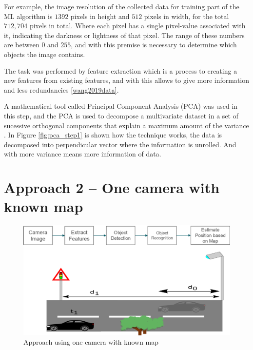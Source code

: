 For example, the image resolution of the collected data for training part of the ML algorithm is $1392$ pixels in height and $512$ pixels in width, for the total $712,704$ pixels in total. Where each pixel has a single pixel-value associated with it, indicating the darkness or lightness of that pixel. The range of these numbers are between $0$ and $255$, and with this premise is necessary to determine which objects the image contains.

The task was performed by feature extraction which is a process to creating a new features from existing features, and with this allows to give more information and less redundancies \ref{wang2019data}.

A mathematical tool called Principal Component Analysis (PCA) was used in this step, and the PCA is used to decompose a multivariate dataset in a set of sucessive orthogonal components that explain a maximum amount of the variance \cite{pedregosa2011scikit}. In Figure \ref{fig:pca_step1} is shown how the technique works, the data is decomposed into perpendicular vector where the information is unrolled. And with more variance means more information of data.




\section{Approach 2 – One camera with known map}\label{sub:2}
\begin{figure}[H]
\centering
\includegraphics[width=\textwidth]{imagens/proposal2.png}
\caption{Approach using one camera with known map}
\label{fig:proposal2}
\end{figure}


